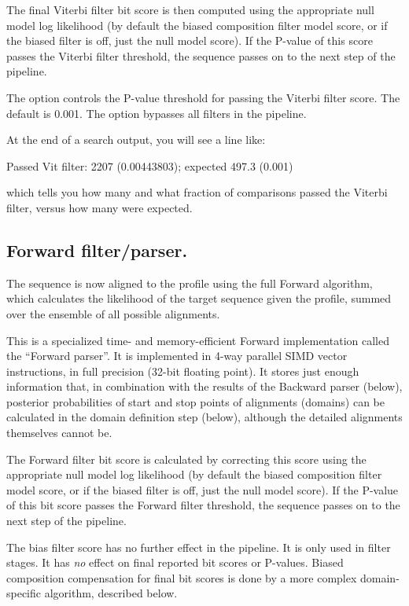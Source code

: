 The final Viterbi filter bit score is then computed using the
appropriate null model log likelihood (by default the biased
composition filter model score, or if the biased filter is off, just
the null model score). If the P-value of this score passes the Viterbi
filter threshold, the sequence passes on to the next step of the
pipeline.
 
The  option controls the P-value threshold for passing
the Viterbi filter score. The default is 0.001.
The  option bypasses all filters in the pipeline.


At the end of a search output, you will see a line like:

\begin{sreoutput}
Passed Vit filter:                      2207  (0.00443803); expected 497.3 (0.001)
\end{sreoutput}

which tells you how many and what fraction of comparisons passed the
Viterbi filter, versus how many were expected.
 
  

\subsection{Forward filter/parser.}

The sequence is now aligned to the profile using the full Forward
algorithm, which calculates the likelihood of the target sequence
given the profile, summed over the ensemble of all possible
alignments.

This is a specialized time- and memory-efficient Forward
implementation called the ``Forward parser''. It is implemented in
4-way parallel SIMD vector instructions, in full precision (32-bit
floating point). It stores just enough information that, in
combination with the results of the Backward parser (below), posterior
probabilities of start and stop points of alignments (domains) can be
calculated in the domain definition step (below), although the
detailed alignments themselves cannot be.

The Forward filter bit score is calculated by correcting this score
using the appropriate null model log likelihood (by default the biased
composition filter model score, or if the biased filter is off, just
the null model score). If the P-value of this bit score passes the
Forward filter threshold, the sequence passes on to the next step of
the pipeline.

The bias filter score has no further effect in the pipeline. It is
only used in filter stages. It has \emph{no} effect on final reported
bit scores or P-values. Biased composition compensation for final bit
scores is done by a more complex domain-specific algorithm, described
below.

